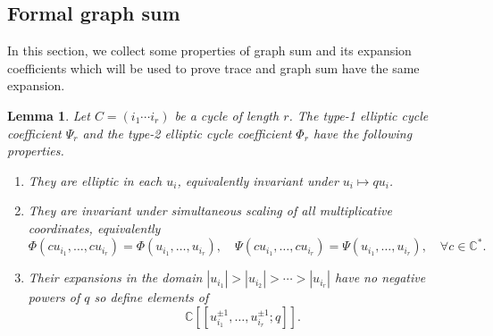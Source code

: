 \documentclass[11pt,a4paper]{amsart}
\numberwithin{equation}{section}
\newtheorem{lemma}[theorem]{Lemma}
\theoremstyle{definition}
\theoremstyle{remark}
\newcommand{\CC}{\mathbb C}
\begin{document}
\subsection{Formal graph sum}

In this section, we collect some properties of graph sum and its expansion coefficients which will be used to prove trace and graph sum have the same expansion.

\begin{lemma}
\label{lem:kernel-identities}
Let $C=(i_1\cdots i_r)$ be a cycle of length $r$.  The type-1 elliptic cycle coefficient $\Psi_r$ and
the type-2 elliptic cycle coefficient $\Phi_r$ have the following properties.
\begin{enumerate}[label=\textup{(\roman*)},leftmargin=2.7em]

\item They are elliptic in each $u_i$, equivalently invariant under $u_i\mapsto qu_i$.
 
 \item They are invariant under simultaneous scaling of all multiplicative coordinates, equivalently
 \[
 \Phi(cu_{i_1},\ldots,cu_{i_r})= \Phi(u_{i_1},\ldots,u_{i_r}), \quad \Psi(cu_{i_1},\ldots,cu_{i_r})= \Psi(u_{i_1},\ldots,u_{i_r}),\quad \forall c\in\CC^*.
 \] 
 
 \item Their expansions in the domain $|u_{i_1}|>|u_{i_2}|>\cdots >|u_{i_r}|$ have no negative powers
 of $q$ so define elements of
 \begin{equation*}
  \CC[[u_{i_1}^{\pm1},\ldots,u_{i_r}^{\pm1};q]].
 \end{equation*}


\end{enumerate}
\end{lemma}
\end{document}

